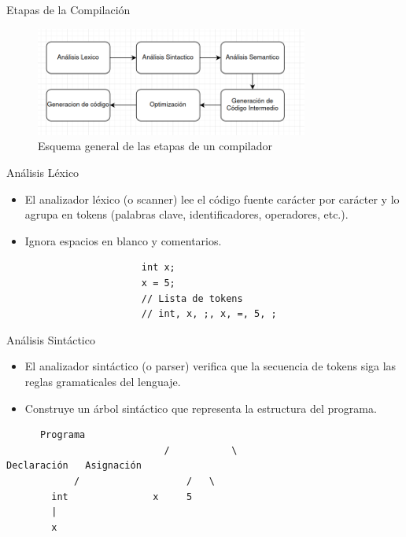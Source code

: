 \documentclass{beamer}
\begin{document}
	\begin{frame}{Etapas de la Compilación}
		
		\begin{figure}
			\includegraphics[width=0.8\textwidth]{diagrama_compilador.png} %
			\caption{Esquema general de las etapas de un compilador}
		\end{figure}
		
	\end{frame}
	
	\begin{frame}[fragile]{Análisis Léxico}
		
		\begin{itemize}
			\item El analizador léxico (o scanner) lee el código fuente carácter por carácter y lo agrupa en tokens (palabras clave, identificadores, operadores, etc.).
			\item Ignora espacios en blanco y comentarios.
		\end{itemize}
		\vspace{1cm} %
		\pause
			\begin{verbatim}
						int x;
						x = 5;
						// Lista de tokens
						// int, x, ;, x, =, 5, ;
			\end{verbatim}
	\end{frame}
	
	\begin{frame}[fragile]{Análisis Sintáctico}
		
		\begin{itemize}
			\item El analizador sintáctico (o parser) verifica que la secuencia de tokens siga las reglas gramaticales del lenguaje.
			\item Construye un árbol sintáctico que representa la estructura del programa.
		\end{itemize}
		\pause
		\begin{verbatim}
      Programa
							/   		\
Declaración   Asignación
			/      			    /   \
		int        		  x     5
		|
		x
		\end{verbatim}
	\end{frame}
	
\end{document}
